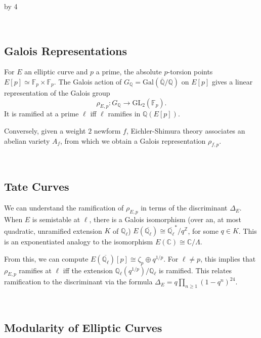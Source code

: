 \documentclass[12pt]{scrartcl}
\def\C{{\mathbb C}}
\def\F{{\mathbb F}}
\def\Q{{\mathbb Q}}
\def\Z{{\mathbb Z}}
\newcommand{\GL}{\text{GL}}
\renewcommand{\bar}{\overline}
\newcommand{\Gal}{\text{Gal}}
\def\anzspalten{4}
\newlength{\kastenwidth}
\newenvironment{kasten}{%
  \begin{lrbox}{\dummybox}%
    \begin{minipage}{0.96\linewidth}}%
    {\end{minipage}%
  \end{lrbox}%
  \raisebox{-\depth}{\psshadowbox[framesep=1em]{\usebox{\dummybox}}}\\[0.5em]}
\newenvironment{spalte}{%
  \setlength\kastenwidth{1.2\textwidth}
  \divide\kastenwidth by \anzspalten
  \begin{minipage}[t]{\kastenwidth}}{\end{minipage}\hfill}
\begin{document}
\begin{lrbox}{\spalten}
{\begin{spalte}
\begin{kasten}
\end{kasten}

\begin{kasten}

\subsection*{\color{blue} Galois Representations}

For $E$ an elliptic curve and $p$ a prime, the absolute $p$-torsion points $E[p] \simeq \F_p \times \F_p$.
The Galois action of $G_\Q = \Gal(\bar{\Q}/\Q)$ on $E[p]$ gives a linear representation of the Galois group 
\[ \rho_{E,p} \colon G_\Q \rightarrow \GL_2(\F_p). \]
It is ramified at a prime $\ell$ iff $\ell$ ramifies in $\Q(E[p])$.  

Conversely, given a weight $2$ newform $f$, Eichler-Shimura theory associates an abelian variety $A_f$, from which we obtain a Galois representation $\rho_{f,p}$.

\end{kasten}

\begin{kasten}

\subsection*{\color{blue} Tate Curves}
We can understand the ramification of $\rho_{E,p}$ in terms of the discriminant $\Delta_E$. When $E$ is semistable at $\ell$, there is a Galois isomorphism (over an, at most quadratic, unramified extension $K$ of $\Q_{\ell}$) $E(\bar{\Q_{\ell}}) \cong \bar{\Q_{\ell}}^*/q^\Z$, for some $q \in K$. This is an exponentiated analogy to the isomorphism $E(\C) \cong \C/\Lambda$. 

From this, we can compute $E(\bar{\Q_{\ell}})[p] \cong \zeta_p \oplus q^{1/p}$. For $\ell \neq p$, this implies that $\rho_{E,p}$ ramifies at $\ell$ iff the extension $\Q_{\ell}(q^{1/p})/\Q_{\ell}$ is ramified. This relates ramification to the discriminant via the formula $\Delta_E = q\prod_{n \geq 1} (1-q^n)^{24}$.
\end{kasten}




\begin{kasten}

\subsection*{\color{blue} Modularity of Elliptic Curves}


\end{kasten}
\end{spalte}}
\end{lrbox}
\end{document}
